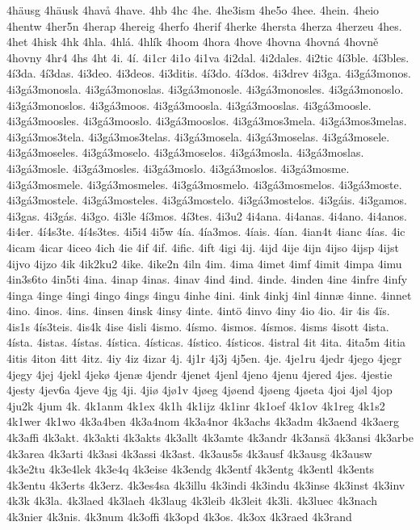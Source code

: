 4häusg
4häusk
4havå
4have.
4hb
4hc
4he.
4he3ism
4he5o
4hee.
4hein.
4heio
4hentw
4her5n
4herap
4hereig
4herfo
4herif
4herke
4hersta
4herza
4herzeu
4hes.
4het
4hisk
4hk
4hla.
4hlá.
4hlík
4hoom
4hora
4hove
4hovna
4hovná
4hovně
4hovny
4hr4
4hs
4ht
4i.
4í.
4i1cr
4i1o
4i1va
4i2dal.
4i2dales.
4i2tic
4í3ble.
4í3bles.
4í3da.
4í3das.
4i3deo.
4i3deos.
4i3ditis.
4í3do.
4í3dos.
4i3drev
4i3ga.
4i3gá3monos.
4i3gá3monosla.
4i3gá3monoslas.
4i3gá3monosle.
4i3gá3monosles.
4i3gá3monoslo.
4i3gá3monoslos.
4i3gá3moos.
4i3gá3moosla.
4i3gá3mooslas.
4i3gá3moosle.
4i3gá3moosles.
4i3gá3mooslo.
4i3gá3mooslos.
4i3gá3mos3mela.
4i3gá3mos3melas.
4i3gá3mos3tela.
4i3gá3mos3telas.
4i3gá3mosela.
4i3gá3moselas.
4i3gá3mosele.
4i3gá3moseles.
4i3gá3moselo.
4i3gá3moselos.
4i3gá3mosla.
4i3gá3moslas.
4i3gá3mosle.
4i3gá3mosles.
4i3gá3moslo.
4i3gá3moslos.
4i3gá3mosme.
4i3gá3mosmele.
4i3gá3mosmeles.
4i3gá3mosmelo.
4i3gá3mosmelos.
4i3gá3moste.
4i3gá3mostele.
4i3gá3mosteles.
4i3gá3mostelo.
4i3gá3mostelos.
4i3gáis.
4i3gamos.
4i3gas.
4i3gás.
4i3go.
4i3le
4í3mos.
4í3tes.
4i3u2
4i4ana.
4i4anas.
4i4ano.
4i4anos.
4i4er.
4í4s3te.
4í4s3tes.
4i5i4
4i5w
4ía.
4ía3mos.
4íais.
4ían.
4ian4t
4ianc
4ías.
4ic
4icam
4icar
4iceo
4ich
4ie
4if
4if.
4ific.
4ift
4igi
4ij.
4ijd
4ije
4ijn
4ijso
4ijsp
4ijst
4ijvo
4ijzo
4ik
4ik2ku2
4ike.
4ike2n
4iln
4im.
4ima
4imet
4imf
4imit
4impa
4imu
4in3s6to
4in5ti
4ina.
4inap
4inas.
4inav
4ind
4ind.
4inde.
4inden
4ine
4infre
4infy
4inga
4inge
4ingi
4ingo
4ings
4ingu
4inhe
4ini.
4ink
4inkj
4inl
4innæ
4inne.
4innet
4ino.
4inos.
4ins.
4insen
4insk
4insy
4inte.
4intö
4invo
4iny
4io
4io.
4ir
4is
4ïs.
4is1s
4ís3teis.
4is4k
4ise
4isli
4ismo.
4ísmo.
4ismos.
4ísmos.
4isms
4isott
4ista.
4ísta.
4istas.
4ístas.
4ística.
4ísticas.
4ístico.
4ísticos.
4istral
4it
4ita.
4ita5m
4itia
4itis
4iton
4itt
4itz.
4iy
4iz
4izar
4j.
4j1r
4j3j
4j5en.
4je.
4je1ru
4jedr
4jego
4jegr
4jegy
4jej
4jekl
4jekø
4jenæ
4jendr
4jenet
4jenl
4jeno
4jenu
4jered
4jes.
4jestie
4jesty
4jev6a
4jeve
4jg
4ji.
4jiø
4jø1v
4jøeg
4jøend
4jøeng
4jøeta
4joi
4jøl
4jop
4ju2k
4jum
4k.
4k1anm
4k1ex
4k1h
4k1ijz
4k1inr
4k1oef
4k1ov
4k1reg
4k1s2
4k1wer
4k1wo
4k3a4ben
4k3a4nom
4k3a4nor
4k3achs
4k3adm
4k3aend
4k3aerg
4k3affi
4k3akt.
4k3akti
4k3akts
4k3allt
4k3amte
4k3andr
4k3ansä
4k3ansi
4k3arbe
4k3area
4k3arti
4k3asi
4k3assi
4k3ast.
4k3aus5s
4k3ausf
4k3ausg
4k3ausw
4k3e2tu
4k3e4lek
4k3e4q
4k3eise
4k3endg
4k3entf
4k3entg
4k3entl
4k3ents
4k3entu
4k3erts
4k3erz.
4k3es4sa
4k3illu
4k3indi
4k3indu
4k3inse
4k3inst
4k3inv
4k3k
4k3la.
4k3laed
4k3laeh
4k3laug
4k3leib
4k3leit
4k3li.
4k3luec
4k3nach
4k3nier
4k3nis.
4k3num
4k3offi
4k3opd
4k3os.
4k3ox
4k3raed
4k3rand
